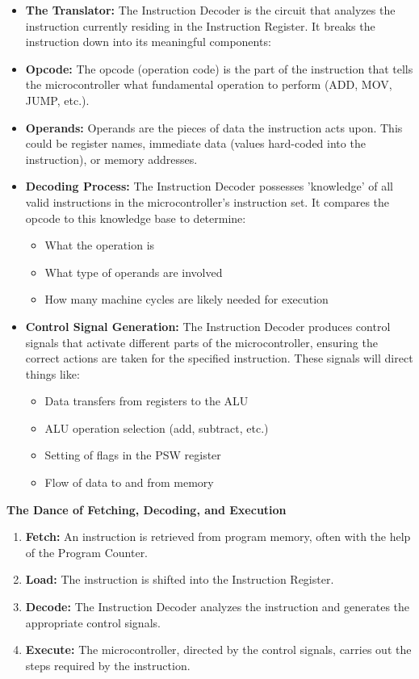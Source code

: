 \documentclass[
]{article}
\begin{document}
\begin{itemize}
\item
  \textbf{The Translator:} The Instruction Decoder is the circuit that
  analyzes the instruction currently residing in the Instruction
  Register. It breaks the instruction down into its meaningful
  components:
\item
  \textbf{Opcode:} The opcode (operation code) is the part of the
  instruction that tells the microcontroller what fundamental operation
  to perform (ADD, MOV, JUMP, etc.).
\item
  \textbf{Operands:} Operands are the pieces of data the instruction
  acts upon. This could be register names, immediate data (values
  hard-coded into the instruction), or memory addresses.
\item
  \textbf{Decoding Process:} The Instruction Decoder possesses
  'knowledge' of all valid instructions in the microcontroller's
  instruction set. It compares the opcode to this knowledge base to
  determine:

  \begin{itemize}
  \item
    What the operation is
  \item
    What type of operands are involved
  \item
    How many machine cycles are likely needed for execution
  \end{itemize}
\item
  \textbf{Control Signal Generation:} The Instruction Decoder produces
  control signals that activate different parts of the microcontroller,
  ensuring the correct actions are taken for the specified instruction.
  These signals will direct things like:

  \begin{itemize}
  \item
    Data transfers from registers to the ALU
  \item
    ALU operation selection (add, subtract, etc.)
  \item
    Setting of flags in the PSW register
  \item
    Flow of data to and from memory
  \end{itemize}
\end{itemize}

\textbf{The Dance of Fetching, Decoding, and Execution}

\begin{enumerate}
\def\labelenumi{\arabic{enumi}.}
\item
  \textbf{Fetch:} An instruction is retrieved from program memory, often
  with the help of the Program Counter.
\item
  \textbf{Load:} The instruction is shifted into the Instruction
  Register.
\item
  \textbf{Decode:} The Instruction Decoder analyzes the instruction and
  generates the appropriate control signals.
\item
  \textbf{Execute:} The microcontroller, directed by the control
  signals, carries out the steps required by the instruction.
\end{enumerate}
\end{document}
